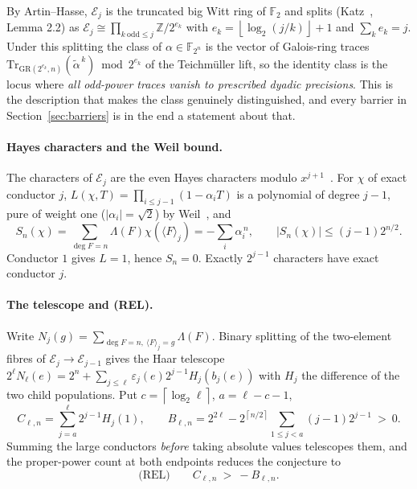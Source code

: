 \documentclass[10pt]{article}
\theoremstyle{plain}
\theoremstyle{definition}
\newcommand{\F}{\mathbb F}
\newcommand{\Z}{\mathbb Z}
\newcommand{\E}{\mathcal E}
\newcommand{\Lam}{\Lambda}
\newcommand{\ceil}[1]{\left\lceil #1\right\rceil}
\newcommand{\flr}[1]{\left\lfloor #1\right\rfloor}
\newcommand{\Tr}{\mathrm{Tr}}
\newcommand{\GR}{\mathrm{GR}}
\begin{document}
By Artin--Hasse, $\E_j$ is the truncated big Witt ring of $\F_2$ and splits
(Katz~\cite{Katz13}, Lemma 2.2) as
$\E_j\cong\prod_{k\ \mathrm{odd}\le j}\Z/2^{e_k}$ with
$e_k=\flr{\log_2(j/k)}+1$ and $\sum_k e_k=j$. Under this splitting the class of
$\alpha\in\F_{2^n}$ is the vector of Galois-ring traces
$\Tr_{\GR(2^{e_k},n)}(\tilde\alpha^{\,k})\bmod 2^{e_k}$ of the Teichm\"uller
lift, so the identity class is the locus where \emph{all odd-power traces
vanish to prescribed dyadic precisions}. This is the description that makes
the class genuinely distinguished, and every barrier in Section~\ref{sec:barriers}
is in the end a statement about that.

\paragraph{Hayes characters and the Weil bound.} The characters of $\E_j$ are
the even Hayes characters modulo $x^{j+1}$~\cite{Hayes}. For $\chi$ of exact
conductor $j$, $L(\chi,T)=\prod_{i\le j-1}(1-\alpha_i T)$ is a polynomial of
degree $j-1$, pure of weight one ($|\alpha_i|=\sqrt2$) by Weil~\cite{Weil}, and
\[
 S_n(\chi)=\sum_{\deg F=n}\Lam(F)\chi(\langle F\rangle_j)=-\sum_i\alpha_i^{\,n},
 \qquad |S_n(\chi)|\le(j-1)2^{n/2}.
\]
Conductor $1$ gives $L=1$, hence $S_n=0$. Exactly $2^{j-1}$ characters have
exact conductor $j$.

\paragraph{The telescope and (REL).} Write
$N_j(g)=\sum_{\deg F=n,\ \langle F\rangle_j=g}\Lam(F)$. Binary splitting of the
two-element fibres of $\E_j\to\E_{j-1}$ gives the Haar telescope
$2^{\ell}N_\ell(e)=2^n+\sum_{j\le\ell}\varepsilon_j(e)2^{j-1}H_j(b_j(e))$ with
$H_j$ the difference of the two child populations. Put
$c=\ceil{\log_2\ell}$, $a=\ell-c-1$,
\[
 C_{\ell,n}=\sum_{j=a}^{\ell}2^{j-1}H_j(1),
 \qquad
 B_{\ell,n}=2^{2\ell}-2^{\ceil{n/2}}\sum_{1\le j<a}(j-1)2^{j-1}\ >\ 0 .
\]
Summing the large conductors \emph{before} taking absolute values telescopes
them, and the proper-power count at both endpoints reduces the conjecture to
\[
 \textrm{(REL)}\qquad C_{\ell,n}\ >\ -B_{\ell,n}.
\]
\end{document}
